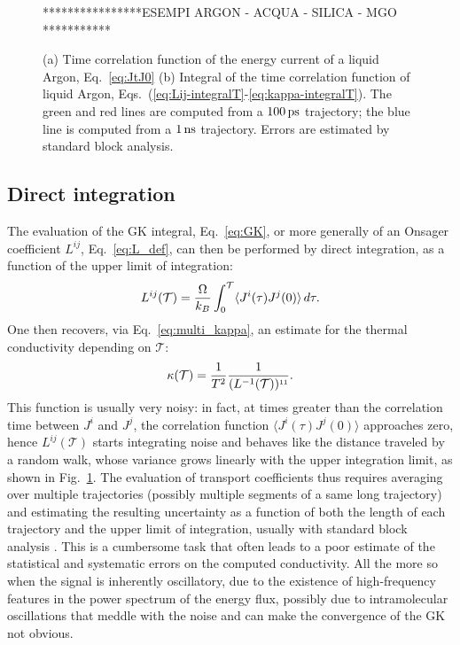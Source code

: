 \begin{figure}
    \begin{center}
    ****************ESEMPI ARGON - ACQUA - SILICA - MGO ***********
    \end{center}
	\caption{(a) Time correlation function of the energy current of a liquid Argon, Eq.~\eqref{eq:JtJ0}
    (b) Integral of the time correlation function of liquid Argon, Eqs.~(\ref{eq:Lij-integralT}-\ref{eq:kappa-integralT}).
    The green and red lines are computed from a $100\,\mathrm{ps}$ trajectory; the blue line is computed from a $1\,\mathrm{ns}$ trajectory.
    Errors are estimated by standard block analysis.} \label{fig:kappa-examples}
\end{figure}


\subsection{Direct integration}
The evaluation of the GK integral, Eq.~\eqref{eq:GK}, or more generally of an Onsager coefficient $L^{ij}$, Eq.~\eqref{eq:L_def}, can then be performed by direct integration, as a function of the upper limit of integration: 
\begin{equation}
    L^{ij}(\mathcal{T}) = \frac{\rOmega}{k_B} \int_0^\mathcal{T} \langle J^i(\tau)J^j(0)\rangle \,d\tau .  \label{eq:Lij-integralT}
\end{equation}
One then recovers, via Eq.~\eqref{eq:multi_kappa}, an estimate for the thermal conductivity depending on $\mathcal{T}$:
\begin{equation}
    \kappa(\mathcal{T}) = \frac{1}{T^2} \frac{1}{(L^{-1}(\mathcal{T}))^{\smallone\smallone}}.  \label{eq:kappa-integralT}
\end{equation}
This function is usually very noisy: in fact, at times greater than the correlation time between $J^i$ and $J^j$, the correlation function $\langle J^i(\tau)J^j(0)\rangle$ approaches zero, hence $L^{ij}(\mathcal{T})$ starts integrating noise and behaves like the distance traveled by a random walk, whose variance grows linearly with the upper integration limit, as shown in Fig.~\ref{fig:kappa-examples}.
The evaluation of transport coefficients thus requires averaging over multiple trajectories (possibly multiple segments of a same long trajectory) and estimating the resulting uncertainty as a function of both the length of each trajectory and the upper limit of integration, usually with standard block analysis \cite{Frenkel2001}. This is a cumbersome task that often leads to a poor estimate of the statistical and systematic errors on the computed conductivity. All the more so when the signal is inherently oscillatory, due to the existence of high-frequency features in the power spectrum of the energy flux, possibly due to intramolecular oscillations that meddle with the noise and can make the convergence of the GK not obvious.

